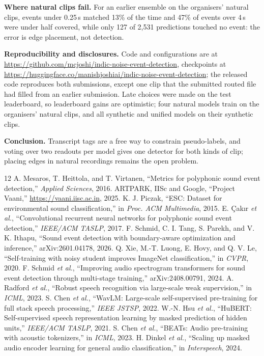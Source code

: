 \documentclass[conference]{IEEEtran}
\begin{document}
\textbf{Where natural clips fail.}
For an earlier ensemble on the organisers' natural clips, events under 0.25\,s matched 13\% of the time and 47\% of events over 4\,s were under half covered, while only 127 of 2,531 predictions touched no event: the error is edge placement, not detection.

\textbf{Reproducibility and disclosures.}
Code and configurations are at \url{https://github.com/mcjoshi/indic-noise-event-detection}, checkpoints at \url{https://huggingface.co/manishjoshiai/indic-noise-event-detection}; the released code reproduces both submissions, except one clip that the submitted routed file had filled from an earlier submission.
Late choices were made on the test leaderboard, so leaderboard gains are optimistic; four natural models train on the organisers' natural clips, and all synthetic and unified models on their synthetic clips.

\textbf{Conclusion.}
Transcript tags are a free way to constrain pseudo-labels, and voting over two readouts per model gives one detector for both kinds of clip; placing edges in natural recordings remains the open problem.


\begin{thebibliography}{12}
\footnotesize
{} A. Mesaros, T. Heittola, and T. Virtanen, ``Metrics for polyphonic sound event detection,'' \emph{Applied Sciences}, 2016.
 ARTPARK, IISc and Google, ``Project Vaani,'' \url{https://vaani.iisc.ac.in}, 2025.
 K. J. Piczak, ``ESC: Dataset for environmental sound classification,'' in \emph{Proc. ACM Multimedia}, 2015.
 E. \c{C}ak{\i}r \emph{et al.}, ``Convolutional recurrent neural networks for polyphonic sound event detection,'' \emph{IEEE/ACM TASLP}, 2017.
 F. Schmid, C. I. Tang, S. Parekh, and V. K. Ithapu, ``Sound event detection with boundary-aware optimization and inference,'' arXiv:2601.04178, 2026.
 Q. Xie, M.-T. Luong, E. Hovy, and Q. V. Le, ``Self-training with noisy student improves ImageNet classification,'' in \emph{CVPR}, 2020.
 F. Schmid \emph{et al.}, ``Improving audio spectrogram transformers for sound event detection through multi-stage training,'' arXiv:2408.00791, 2024.
 A. Radford \emph{et al.}, ``Robust speech recognition via large-scale weak supervision,'' in \emph{ICML}, 2023.
 S. Chen \emph{et al.}, ``WavLM: Large-scale self-supervised pre-training for full stack speech processing,'' \emph{IEEE JSTSP}, 2022.
 W.-N. Hsu \emph{et al.}, ``HuBERT: Self-supervised speech representation learning by masked prediction of hidden units,'' \emph{IEEE/ACM TASLP}, 2021.
 S. Chen \emph{et al.}, ``BEATs: Audio pre-training with acoustic tokenizers,'' in \emph{ICML}, 2023.
 H. Dinkel \emph{et al.}, ``Scaling up masked audio encoder learning for general audio classification,'' in \emph{Interspeech}, 2024.
\end{thebibliography}
\end{document}

